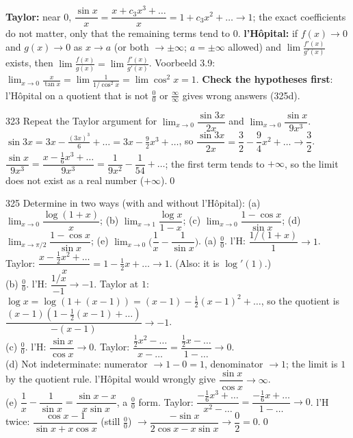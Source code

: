 \begin{result}
\textbf{Taylor:} near $0$, $\dfrac{\sin x}x=\dfrac{x+c_3x^3+\dots}x=1+c_3x^2+\dots\to1$; the exact coefficients do not matter, only that the remaining terms tend to $0$. \textbf{l'H\^opital:} if $f(x)\to0$ and $g(x)\to0$ as $x\to a$ (or both $\to\pm\infty$; $a=\pm\infty$ allowed) and $\lim\frac{f'(x)}{g'(x)}$ exists, then $\lim\frac{f(x)}{g(x)}=\lim\frac{f'(x)}{g'(x)}$. Voorbeeld 3.9: $\lim_{x\to0}\frac x{\tan x}=\lim\frac1{1/\cos^2x}=\lim\cos^2x=1$. \textbf{Check the hypotheses first}: l'H\^opital on a quotient that is not $\frac00$ or $\frac\infty\infty$ gives wrong answers (325d).
\end{result}

\begin{bookex}{323}
Repeat the Taylor argument for $\lim_{x\to0}\dfrac{\sin3x}{2x}$ and $\lim_{x\to0}\dfrac{\sin x}{9x^3}$.
\solution
$\sin3x=3x-\frac{(3x)^3}6+\dots=3x-\frac92x^3+\dots$, so $\dfrac{\sin3x}{2x}=\dfrac32-\dfrac94x^2+\dots\to\dfrac32$.\\
$\dfrac{\sin x}{9x^3}=\dfrac{x-\frac16x^3+\dots}{9x^3}=\dfrac1{9x^2}-\dfrac1{54}+\dots$; the first term tends to $+\infty$, so the limit does not exist as a real number ($+\infty$).\qed
\end{bookex}

\begin{bookex}{325}
Determine in two ways (with and without l'H\^opital): (a) $\lim_{x\to0}\dfrac{\log(1+x)}x$; (b) $\lim_{x\to1}\dfrac{\log x}{1-x}$; (c) $\lim_{x\to0}\dfrac{1-\cos x}{\sin x}$; (d) $\lim_{x\to\pi/2}\dfrac{1-\cos x}{\sin x}$; (e) $\lim_{x\to0}\Big(\dfrac1x-\dfrac1{\sin x}\Big)$.
\solution
(a) $\frac00$. l'H: $\dfrac{1/(1+x)}1\to1$. Taylor: $\dfrac{x-\frac12x^2+\dots}x=1-\frac12x+\dots\to1$. (Also: it is $\log'(1)$.)\\
(b) $\frac00$. l'H: $\dfrac{1/x}{-1}\to-1$. Taylor at $1$: $\log x=\log(1+(x-1))=(x-1)-\frac12(x-1)^2+\dots$, so the quotient is $\dfrac{(x-1)(1-\frac12(x-1)+\dots)}{-(x-1)}\to-1$.\\
(c) $\frac00$. l'H: $\dfrac{\sin x}{\cos x}\to0$. Taylor: $\dfrac{\frac12x^2-\dots}{x-\dots}=\dfrac{\frac12x-\dots}{1-\dots}\to0$.\\
(d) Not indeterminate: numerator $\to1-0=1$, denominator $\to1$; the limit is $1$ by the quotient rule. l'H\^opital would wrongly give $\dfrac{\sin x}{\cos x}\to\infty$.\\
(e) $\dfrac1x-\dfrac1{\sin x}=\dfrac{\sin x-x}{x\sin x}$, a $\frac00$ form. Taylor: $\dfrac{-\frac16x^3+\dots}{x^2-\dots}=\dfrac{-\frac16x+\dots}{1-\dots}\to0$. l'H twice: $\dfrac{\cos x-1}{\sin x+x\cos x}$ (still $\frac00$) $\to\dfrac{-\sin x}{2\cos x-x\sin x}\to\dfrac02=0$.\qed
\end{bookex}

